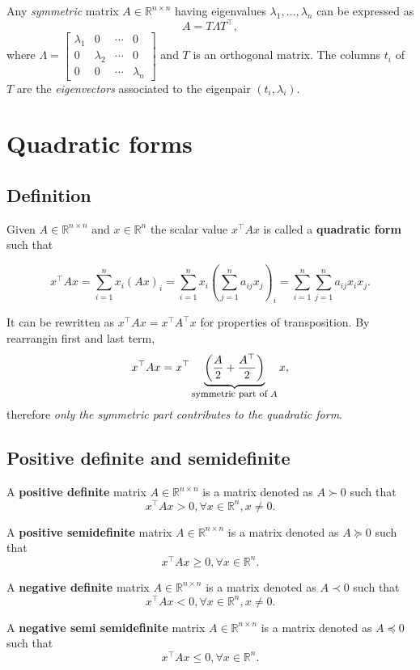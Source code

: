 \documentclass[10pt]{report}
\begin{document}
Any \emph{symmetric} matrix \(A\in\mathbb{R}^{n \times n}\) having eigenvalues \(\lambda_1,\dots,\lambda_n\) can be expressed as $$A = T\Lambda T^\top, $$ where \(\Lambda = \begin{bmatrix} \lambda_1 & 0 & \cdots & 0 \\ 0 & \lambda_2 & \cdots & 0 \\ 0 & 0 & \cdots & \lambda_n\end{bmatrix}\) and \(T\) is an orthogonal matrix. The columns \(t_i\) of \(T\) are the \emph{eigenvectors} associated to the eigenpair \((t_i, \lambda_i)\).
\section{Quadratic forms}
\label{sec:org39e31f8}
\subsection{Definition}
\label{sec:org2b1b92a}
Given \(A\in\mathbb{R}^{n\times n}\) and \(x\in\mathbb{R}^n\) the scalar value \(x^\top A x\) is called a \textbf{quadratic form} such that

$$x^\top A x = \sum_{i=1}^n x_i(Ax)_i = \sum_{i=1}^n x_i\left(\sum_{j=1}^n a_{ij}x_j\right)_i = \sum_{i=1}^n\sum_{j=1}^n a_{ij}x_i x_j.$$

It can be rewritten as \(x^\top A x = x^\top A^\top x\) for properties of transposition. By rearrangin first and last term, $$x^\top A x = x^\top \underbrace{\left( \frac A 2 + \frac{A^\top}{2} \right)}_{\footnotesize \mbox{symmetric part of } A}x,$$ therefore \emph{only the symmetric part contributes to the quadratic form}.
\subsection{Positive definite and semidefinite}
\label{sec:org4e1064b}
A \textbf{positive definite} matrix \(A\in\mathbb{R}^{n \times n}\) is a matrix denoted as \(A \succ 0\) such that $$x^\top A x > 0, \forall x\in\mathbb{R}^n, x \neq 0.$$

A \textbf{positive semidefinite} matrix \(A\in\mathbb{R}^{n \times n}\) is a matrix denoted as \(A \succeq 0\) such that $$x^\top A x \geq 0, \forall x\in\mathbb{R}^n.$$

A \textbf{negative definite} matrix \(A\in\mathbb{R}^{n \times n}\) is a matrix denoted as \(A \prec 0\) such that $$x^\top A x < 0, \forall x\in\mathbb{R}^n, x \neq 0.$$

A \textbf{negative semi semidefinite} matrix \(A\in\mathbb{R}^{n \times n}\) is a matrix denoted as \(A \preceq 0\) such that $$x^\top A x \leq 0, \forall x\in\mathbb{R}^n.$$
\end{document}

